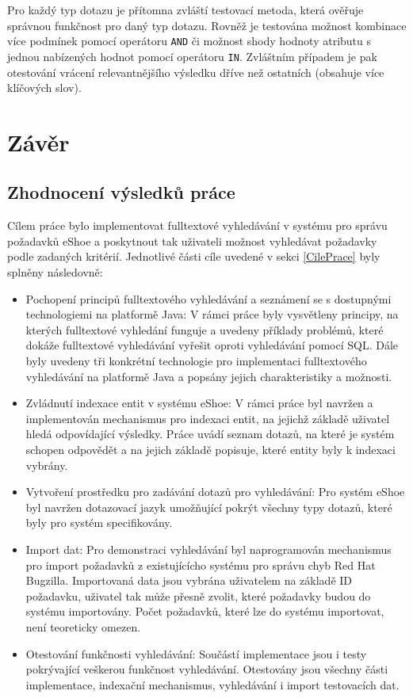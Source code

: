 \documentclass[11pt,oneside]{fithesis2}
\begin{document}
Pro každý typ dotazu je přítomna zvláští testovací metoda, která ověřuje správnou funkčnost pro daný typ dotazu. Rovněž je testována možnost kombinace více podmínek pomocí operátoru \texttt{AND} či možnost shody hodnoty atributu s jednou nabízených hodnot pomocí operátoru \texttt{IN}. Zvláštním případem je pak otestování vrácení relevantnějšího výsledku dříve než ostatních (obsahuje více klíčových slov). 


\chapter{Závěr}
\label{ZaverChapter}

\section{Zhodnocení výsledků práce}
Cílem práce bylo implementovat fulltextové vyhledávání v systému pro správu požadavků eShoe a poskytnout tak uživateli možnost vyhledávat požadavky podle zadaných kritérií. Jednotlivé části cíle uvedené v sekci \ref{CilePrace} byly splněny následovně:
\begin{itemize}
	\item Pochopení principů fulltextového vyhledávání a seznámení se s dostupnými technologiemi na platformě Java: V rámci práce byly vysvětleny principy, na kterých fulltextové vyhledání funguje a uvedeny příklady problémů, které dokáže fulltextové vyhledávání vyřešit oproti vyhledávání pomocí SQL. Dále byly uvedeny tři konkrétní technologie pro implementaci fulltextového vyhledávání na platformě Java a popsány jejich charakteristiky a možnosti.

	\item Zvládnutí indexace entit v systému eShoe: V rámci práce byl navržen a implementován mechanismus pro indexaci entit, na jejichž základě uživatel hledá odpovídající výsledky. Práce uvádí seznam dotazů, na které je systém schopen odpovědět a na jejich základě popisuje, které entity byly k indexaci vybrány.

	\item Vytvoření prostředku pro zadávání dotazů pro vyhledávání: Pro systém eShoe byl navržen dotazovací jazyk umožňující pokrýt všechny typy dotazů, které byly pro systém specifikovány.

	\item Import dat: Pro demonstraci vyhledávání byl naprogramován mechanismus pro import požadavků z existujícícho systému pro správu chyb Red Hat Bugzilla. Importovaná data jsou vybrána uživatelem na základě ID požadavku, uživatel tak může přesně zvolit, které požadavky budou do systému importovány. Počet požadavků, které lze do systému importovat, není teoreticky omezen. 

	\item Otestování funkčnosti vyhledávání: Součástí implementace jsou i testy pokrývající veškerou funkčnost vyhledávání. Otestovány jsou všechny části implementace, indexační mechanismus, vyhledávání i import testovacích dat.
\end{itemize}
\end{document}
